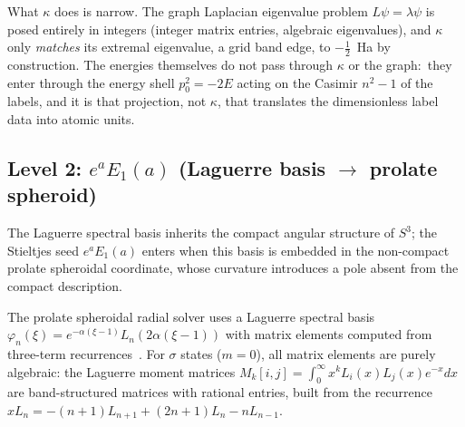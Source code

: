\documentclass[aps,pra,twocolumn,superscriptaddress,longbibliography]{revtex4-2}
\begin{document}
What $\kappa$ does is narrow.  The graph Laplacian eigenvalue problem
$L\psi = \lambda\psi$ is posed entirely in integers (integer matrix
entries, algebraic eigenvalues), and $\kappa$ only \emph{matches} its
extremal eigenvalue, a grid band edge, to $-\tfrac12$~Ha by
construction.  The energies themselves do not pass through $\kappa$ or
the graph:\ they enter through the energy shell $p_0^2 = -2E$ acting on
the Casimir $n^2 - 1$ of the labels, and it is that projection, not
$\kappa$, that translates the dimensionless label data into atomic
units.

\subsection{Level 2: $e^a E_1(a)$ (Laguerre basis $\to$ prolate spheroid)}
\label{sec:stieltjes}

The Laguerre spectral basis inherits the compact angular structure of
$S^3$; the Stieltjes seed $e^a E_1(a)$ enters when this basis is
embedded in the non-compact prolate spheroidal coordinate, whose
curvature introduces a pole absent from the compact description.

The prolate spheroidal radial solver uses a Laguerre spectral
basis $\varphi_n(\xi) = e^{-\alpha(\xi-1)} L_n(2\alpha(\xi-1))$
with matrix elements computed from three-term
recurrences~\cite{loutey_paper11}.  For $\sigma$ states ($m = 0$),
all matrix elements are purely algebraic: the Laguerre moment
matrices $M_k[i,j] = \int_0^\infty x^k L_i(x) L_j(x) e^{-x}
dx$ are band-structured matrices with rational entries, built
from the recurrence $x L_n = -(n+1)L_{n+1} + (2n+1)L_n -
nL_{n-1}$.
\end{document}
